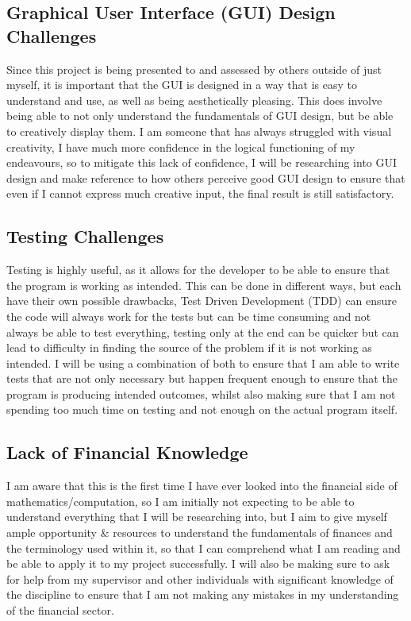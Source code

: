 \documentclass{article}
\begin{document}
\subsection{Graphical User Interface (GUI) Design Challenges}
Since this project is being presented to and assessed by others outside of just myself, it is important that the GUI is designed in a way that is easy to understand and use, as well as being aesthetically pleasing. This does involve being able to not only understand the fundamentals of GUI design, but be able to creatively display them. I am someone that has always struggled with visual creativity, I have much more confidence in the logical functioning of my endeavours, so to mitigate this lack of confidence, I will be researching into GUI design and make reference to how others perceive good GUI design to ensure that even if I cannot express much creative input, the final result is still satisfactory.

\subsection{Testing Challenges}
Testing is highly useful, as it allows for the developer to be able to ensure that the program is working as intended. This can be done in different ways, but each have their own possible drawbacks, Test Driven Development (TDD) can ensure the code will always work for the tests but can be time consuming and not always be able to test everything, testing only at the end can be quicker but can lead to difficulty in finding the source of the problem if it is not working as intended. I will be using a combination of both to ensure that I am able to write tests that are not only necessary but happen frequent enough to ensure that the program is producing intended outcomes, whilst also making sure that I am not spending too much time on testing and not enough on the actual program itself.

\subsection{Lack of Financial Knowledge}
I am aware that this is the first time I have ever looked into the financial side of mathematics/computation, so I am initially not expecting to be able to understand everything that I will be researching into, but I aim to give myself ample opportunity \& resources to understand the fundamentals of finances and the terminology used within it, so that I can comprehend what I am reading and be able to apply it to my project successfully. I will also be making sure to ask for help from my supervisor and other individuals with significant knowledge of the discipline to ensure that I am not making any mistakes in my understanding of the financial sector.
\end{document}
